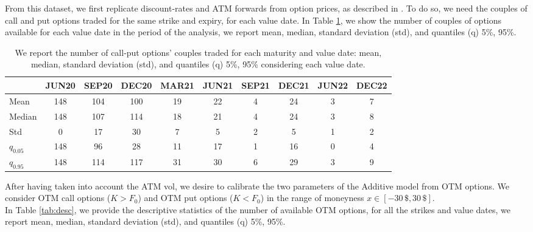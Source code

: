 \documentclass[12pt]{article}
\theoremstyle{definition}
\theoremstyle{remark}
\numberwithin{theorem}{section}
\numberwithin{proposition}{section}
\numberwithin{lemma}{section}
\numberwithin{corollary}{section}
\numberwithin{definition}{section}
\numberwithin{remark}{section}
\numberwithin{example}{section}
\begin{document}
From this dataset, we first replicate discount-rates and ATM forwards from option prices, as described in \cite{azzone2021synthetic}. To do so, we need the couples of call and put options traded for the same strike and expiry, for each value date. In Table \ref{tab:put_call_couples}, we show the number of couples of options available for each value date in the period of the analysis, we report mean, median, standard deviation (std), and quantiles (q) 5\%, 95\%.

\begin{table}[H]
    \centering
\small{
    \begin{tabular}{|l|c|c|c|c|c|c|c|c|c|}
        \toprule
         & JUN20 & SEP20 & DEC20 & MAR21 & JUN21 & SEP21 & DEC21 & JUN22 & DEC22 \\    
        \bottomrule
        \toprule
        Mean & 148 & 104 & 100 & 19 & 22 & 4 & 24 & 3 & 7 \\
        Median & 148 & 107 & 114 & 18 & 21 & 4 & 24 & 3 & 8 \\
        Std & 0 & 17 & 30 & 7 & 5 & 2 & 5 & 1 & 2 \\
        $q_{0.05}$ & 148 & 96 & 28 & 11 & 17 & 1 & 16 & 0 & 4 \\
        $q_{0.95}$ & 148 & 114 & 117 & 31 & 30 & 6 & 29 & 3 & 9 \\
        \bottomrule
    \end{tabular}}
    \caption{\small{We report the number of call-put options' couples traded for each maturity and value date: mean, median, standard deviation (std), and quantiles (q) 5\%, 95\%  considering each value date.}}
    \label{tab:put_call_couples}
\end{table}

After having taken into account the ATM vol, we desire to calibrate the two parameters of the Additive model from OTM options. We consider OTM call options ($K>F_0$) and OTM put options ($K<F_0$) in the range of moneyness $x\in[-30\,\$,30\,\$]$.\\
In Table \ref{tab:desc}, we provide the descriptive statistics of the number of available OTM options, for all the strikes and value dates, we report mean, median, standard deviation (std), and quantiles (q) 5\%, 95\%.
\end{document}
